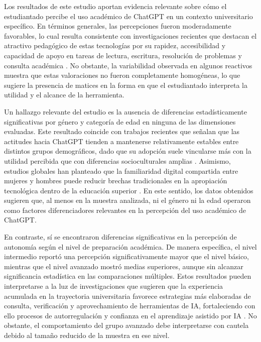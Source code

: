 \documentclass[spanish]{textolivre}
\begin{document}
Los resultados de este estudio aportan evidencia relevante sobre cómo el estudiantado percibe el uso académico de ChatGPT en un contexto universitario específico. En términos generales, las percepciones fueron moderadamente favorables, lo cual resulta consistente con investigaciones recientes que destacan el atractivo pedagógico de estas tecnologías por su rapidez, accesibilidad y capacidad de apoyo en tareas de lectura, escritura, resolución de problemas y consulta académica \cite{Stone2025,SunLiHossainZabin2025}. No obstante, la variabilidad observada en algunos reactivos muestra que estas valoraciones no fueron completamente homogéneas, lo que sugiere la presencia de matices en la forma en que el estudiantado interpreta la utilidad y el alcance de la herramienta.

Un hallazgo relevante del estudio es la ausencia de diferencias estadísticamente significativas por género y categoría de edad en ninguna de las dimensiones evaluadas. Este resultado coincide con trabajos recientes que señalan que las actitudes hacia ChatGPT tienden a mantenerse relativamente estables entre distintos grupos demográficos, dado que su adopción suele vincularse más con la utilidad percibida que con diferencias socioculturales amplias \cite{Haq2025,Pitts2025}. Asimismo, estudios globales han planteado que la familiaridad digital compartida entre mujeres y hombres puede reducir brechas tradicionales en la apropiación tecnológica dentro de la educación superior \cite{MartinMoncunillAlonsoMartinez2025}. En este sentido, los datos obtenidos sugieren que, al menos en la muestra analizada, ni el género ni la edad operaron como factores diferenciadores relevantes en la percepción del uso académico de ChatGPT.


En contraste, sí se encontraron diferencias significativas en la percepción de autonomía según el nivel de preparación académica. De manera específica, el nivel intermedio reportó una percepción significativamente mayor que el nivel básico, mientras que el nivel avanzado mostró medias superiores, aunque sin alcanzar significancia estadística en las comparaciones múltiples. Estos resultados pueden interpretarse a la luz de investigaciones que sugieren que la experiencia acumulada en la trayectoria universitaria favorece estrategias más elaboradas de consulta, verificación y aprovechamiento de herramientas de IA, fortaleciendo con ello procesos de autorregulación y confianza en el aprendizaje asistido por IA \cite{Dong2024,Hong2025}. No obstante, el comportamiento del grupo avanzado debe interpretarse con cautela debido al tamaño reducido de la muestra en ese nivel.
\end{document}
